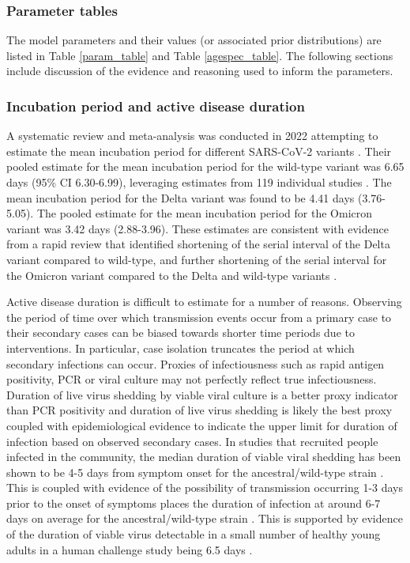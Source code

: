 \subsubsection{Parameter tables}
The model parameters and their values (or associated prior distributions) are listed in Table \ref{param_table} and Table \ref{agespec_table}. The
following sections include discussion of the evidence and reasoning used to inform the parameters.

\renewcommand{\arraystretch}{1.3}
 

\renewcommand{\arraystretch}{1.3}
 


\subsubsection{Incubation period and active disease duration}
A systematic review and meta-analysis was conducted in 2022 attempting to estimate the mean incubation period for 
different SARS-CoV-2 variants \cite{wu2022}. Their pooled estimate for the mean incubation period for the wild-type 
variant was 6.65 days (95\% CI 6.30-6.99), leveraging estimates from 119 individual studies \cite{wu2022}.
The mean incubation period for the Delta variant was found to be 4.41 days (3.76-5.05). 
The pooled estimate for the mean incubation period for the Omicron variant was 3.42 days (2.88-3.96). 
These estimates are consistent with evidence from a rapid review that identified shortening of the serial interval of the 
Delta variant compared to wild-type, and further shortening of the serial interval for the Omicron variant compared to the 
Delta and wild-type variants \cite{madewell2023}.

Active disease duration is difficult to estimate for a number of reasons. Observing the period of time over which transmission events
occur from a primary case to their secondary cases can be biased towards shorter time periods due to interventions. In particular, 
case isolation truncates the period at which secondary infections can occur. Proxies of infectiousness such as rapid 
antigen positivity, PCR or viral culture may not perfectly reflect true infectiousness. Duration of live virus shedding by viable 
viral culture is a better proxy indicator than PCR positivity and duration of live virus shedding is likely the best proxy coupled 
with epidemiological evidence to indicate the upper limit for duration of infection based on observed secondary cases.
In studies that recruited people infected in the community, the median duration of viable viral shedding has been shown to be 
4-5 days from symptom onset for the ancestral/wild-type strain \cite{singanayagam2020, hakki2022}. This is coupled with evidence of 
the possibility of transmission occurring 1-3 days prior to the onset of symptoms places the duration of infection at around 6-7 days 
on average for the ancestral/wild-type strain \cite{he2020}. This is supported by evidence of the duration of viable virus 
detectable in a small number of healthy young adults in a human challenge study being 6.5 days \cite{killingley2022}. 

